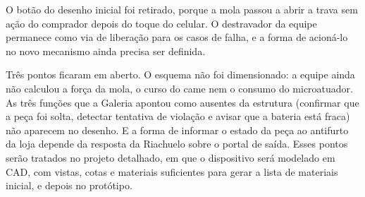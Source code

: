 O botão do desenho inicial foi retirado, porque a mola passou a abrir a trava sem ação do comprador depois do toque do celular. O destravador da equipe permanece como via de liberação para os casos de falha, e a forma de acioná-lo no novo mecanismo ainda precisa ser definida.

Três pontos ficaram em aberto. O esquema não foi dimensionado: a equipe ainda não calculou a força da mola, o curso do came nem o consumo do microatuador. As três funções que a Galeria apontou como ausentes da estrutura (confirmar que a peça foi solta, detectar tentativa de violação e avisar que a bateria está fraca) não aparecem no desenho. E a forma de informar o estado da peça ao antifurto da loja depende da resposta da Riachuelo sobre o portal de saída. Esses pontos serão tratados no projeto detalhado, em que o dispositivo será modelado em CAD, com vistas, cotas e materiais suficientes para gerar a lista de materiais inicial, e depois no protótipo.
